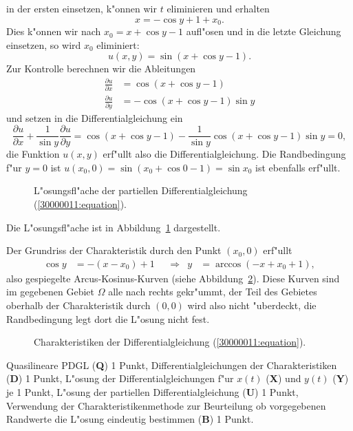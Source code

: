 \begin{loesung}
\begin{teilaufgaben}
in der ersten einsetzen, k"onnen wir $t$ eliminieren und erhalten
\[
x=-\cos y+1+x_0.
\]
Dies k"onnen wir nach $x_0=x+\cos y-1$ aufl"osen und in die letzte Gleichung
einsetzen, so wird $x_0$ eliminiert:
\[
u(x,y)=\sin(x+\cos y - 1).
\]
Zur Kontrolle berechnen wir die Ableitungen
\begin{align*}
\frac{\partial u}{\partial x}
&=
\cos(x+\cos y - 1)
\\
\frac{\partial u}{\partial y}
&=
-\cos(x+\cos y - 1)
\sin y
\end{align*}
und setzen in die Differentialgleichung ein
\[
\frac{\partial u}{\partial x}
+
\frac1{\sin y}\frac{\partial u}{\partial y}
=
\cos(x+\cos y - 1)
-
\frac1{\sin y}
\cos(x+\cos y - 1)
\sin y
=
0,
\]
die Funktion $u(x,y)$ erf"ullt also die Differentialgleichung. 
Die Randbedingung f"ur $y=0$ ist $u(x_0,0)=\sin(x_0+\cos 0 - 1)=\sin x_0$
ist ebenfalls erf"ullt.
\begin{figure}
\centering
{}
\caption{L"osungsfl"ache der partiellen Differentialgleichung
(\ref{30000011:equation}).
\label{30000011:solution}}
\end{figure}
Die L"osungsfl"ache ist in Abbildung~\ref{30000011:solution} dargestellt.
\item
Der Grundriss der Charakteristik durch den Punkt $(x_0,0)$ erf"ullt
\[
\begin{aligned}
\cos y&=-(x-x_0)+1
&&\Rightarrow&
y&=\arccos(-x+x_0+1),
\end{aligned}
\]
also gespiegelte Arcus-Kosinus-Kurven (siehe Abbildung~\ref{30000011:char}).
Diese Kurven sind im gegebenen Gebiet $\Omega$ alle nach rechts gekr"ummt,
der Teil des Gebietes oberhalb der Charakteristik durch $(0,0)$ wird also
nicht "uberdeckt, die Randbedingung legt dort die L"osung nicht fest.
\begin{figure}
\centering
{}
\caption{Charakteristiken der Differentialgleichung (\ref{30000011:equation}).
\label{30000011:char}}
\end{figure}
\end{teilaufgaben}
\end{loesung}

\begin{bewertung}
Quasilineare PDGL ({\bf Q}) 1 Punkt,
Differentialgleichungen der Charakteristiken ({\bf D}) 1 Punkt,
L"osung der Differentialgleichungen f"ur $x(t)$ ({\bf X})
und $y(t)$ ({\bf Y}) je 1 Punkt,
L"osung der partiellen Differentialgleichung ({\bf U}) 1 Punkt,
Verwendung der Charakteristikenmethode zur Beurteilung ob
vorgegebenen Randwerte die L"osung eindeutig bestimmen ({\bf B}) 1 Punkt.
\end{bewertung}

